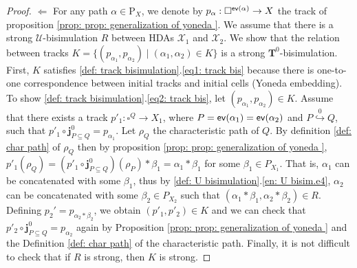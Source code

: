 \documentclass[11pt,a4paper,oldfontcommands]{memoir}
\newcommand*\ev{\textup{\textsf{ev}}}
\newcommand{\TrO}{\mathbf{T}}
\newcommand*\pobj[1]{\square^{#1}}
\newcommand*\jneda{\mathbf{j}}
\newcommand{\ininc}{\stackrel{0}{\hookrightarrow} }
\newtheorem{theorem}[definition]{Theorem}
\begin{document}
\begin{proof}
    $\Leftarrow$ For any path $\alpha \in \mathrm{P}_{X}$, we denote by $p_{\alpha}: \pobj{\ev(\alpha)} \to X$ the track of proposition \ref{prop: prop: generalization of yoneda }. We assume that there is a strong $\mathcal{U}$-bisimulation $R$ between HDAs $\mathcal{X}_1$ and $\mathcal{X}_2$. We show that the relation between tracks $K=\{(p_{\alpha_1},p_{\alpha_2})\mid (\alpha_1,\alpha_2) \in K \}$ is a strong $\TrO^0$-bisimulation. First, $K$ satisfies \ref{def: track bisimulation}.\ref{eq1: track bis} because there is one-to-one correspondence between initial tracks and initial cells (Yoneda embedding). To show \ref{def: track bisimulation}.\ref{eq2: track bis}, let $(p_{\alpha_1},p_{\alpha_2}) \in K$. Assume that there exists a track $p'_1:\pobj{Q} \to X_1 $, where $P=\ev(\alpha_1)=\ev(\alpha_2)$ and $P \ininc Q$, such that $p'_1 \circ \jneda^0_{P\subseteq Q}=p_{\alpha_1}$. Let $\rho_Q$ the characteristic path of $Q$. By definition \ref{def: char path} of $\rho_Q$ then by proposition \ref{prop: prop: generalization of yoneda }, $p'_1(\rho_Q)=(p'_1 \circ \jneda^0_{P\subseteq Q})(\rho_P)*\beta_1= \alpha_1*\beta_1$ for some $\beta_1 \in P_{X_1}$. That is, $\alpha_1$ can be concatenated with some $\beta_1$, thus by \ref{def: U bisimulation}.\ref{en: U bisim.e4}, $\alpha_2$ can be concatenated with some $\beta_2 \in P_{X_2}$ such that $(\alpha_1*\beta_1,\alpha_2*\beta_2) \in R$. Defining $p_2'=p_{\alpha_2*\beta_2}$, we obtain $(p'_1,p'_2)\in K$ and we can check that $p'_2 \circ \jneda^0_{P\subseteq Q}=p_{\alpha_2}$ again by Proposition \ref{prop: prop: generalization of yoneda } and the Definition \ref{def: char path} of the characteristic path. Finally, it is not difficult to check that if $R$ is strong, then $K$ is strong.
\end{proof}







\vspace{1cm}
\end{document}
